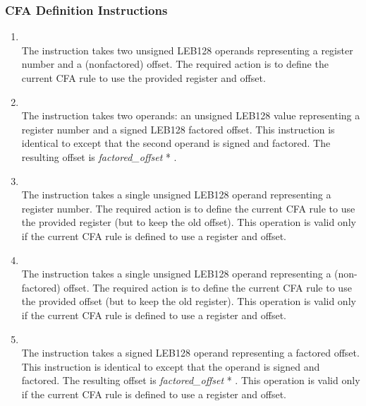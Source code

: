 \label{chap:cfadefinitioninstructions}
\subsubsection{CFA Definition Instructions}
\begin{enumerate}[1. ]

\item \textbf{\DWCFAdefcfaTARG} \\
The \DWCFAdefcfaNAME{}
instruction takes two unsigned LEB128
operands representing a register number and a (non\dash factored)
offset. The required action is to define the current CFA rule
to use the provided register and offset.

\item \textbf{\DWCFAdefcfasfTARG} \\
The \DWCFAdefcfasfNAME{} instruction takes two operands:
an unsigned LEB128 value
representing a register number and a
signed LEB128 factored offset. This instruction is identical
to \DWCFAdefcfa{} except that the second operand is signed
and factored. The resulting offset is \textit{factored\_offset} *
.


\item \textbf{\DWCFAdefcfaregisterTARG} \\
The \DWCFAdefcfaregisterNAME{} 
instruction takes a single
unsigned LEB128 operand representing a register number. The
required action is to define the current CFA rule to use
the provided register (but to keep the old offset). This
operation is valid only if the current CFA rule is defined
to use a register and offset.


\item \textbf{\DWCFAdefcfaoffsetTARG} \\
The \DWCFAdefcfaoffsetNAME{} instruction takes a single
unsigned LEB128 operand representing a (non-factored)
offset. The required action is to define the current CFA rule
to use the provided offset (but to keep the old register). This
operation is valid only if the current CFA rule is defined
to use a register and offset.

\item \textbf{\DWCFAdefcfaoffsetsfTARG} \\
The \DWCFAdefcfaoffsetsfNAME{} instruction takes a signed
LEB128 operand representing a factored offset. This instruction
is identical to \DWCFAdefcfaoffset{} except that the
operand is signed and factored. The resulting offset is
\textit{factored\_offset} * .
This operation
is valid only if the current CFA rule is defined to use a
register and offset.


\end{enumerate}
